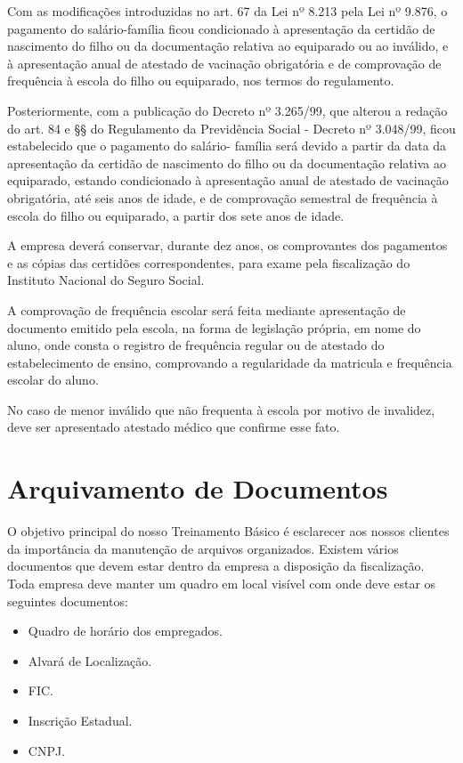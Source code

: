 \documentclass{article}
\begin{document}
Com as modificações introduzidas no art. 67 da Lei nº 8.213 pela Lei nº 9.876, o pagamento do salário-família ficou condicionado à apresentação da certidão de nascimento do filho ou da documentação relativa ao equiparado ou ao inválido, e à apresentação anual de atestado de vacinação obrigatória e de comprovação de frequência à escola do filho ou equiparado, nos termos do regulamento. 

Posteriormente, com a publicação do Decreto nº 3.265/99, que alterou a redação do art. 84 e §§ do Regulamento da Previdência Social - Decreto nº 3.048/99, ficou estabelecido que o pagamento do salário- família será devido a partir da data da apresentação da certidão de nascimento do filho ou da documentação relativa ao equiparado, estando condicionado à apresentação anual de atestado de vacinação obrigatória, até seis anos de idade, e de comprovação semestral de frequência à escola do filho ou equiparado, a partir dos sete anos de idade. 

A empresa deverá conservar, durante dez anos, os comprovantes dos pagamentos e as cópias das certidões correspondentes, para exame pela fiscalização do Instituto Nacional do Seguro Social. 

A comprovação de frequência escolar será feita mediante apresentação de documento emitido pela escola, na forma de legislação própria, em nome do aluno, onde consta o registro de frequência regular ou de atestado do estabelecimento de ensino, comprovando a regularidade da matricula e frequência escolar do aluno. 

No caso de menor inválido que não frequenta à escola por motivo de invalidez, deve ser apresentado atestado médico que confirme esse fato.

\section{Arquivamento de Documentos}
\label{sec:arquivo}
O objetivo principal do nosso Treinamento Básico é esclarecer aos nossos clientes da importância da manutenção de arquivos organizados. Existem vários documentos que devem estar dentro da empresa a disposição da fiscalização. Toda empresa deve manter um quadro em local visível com onde deve estar os seguintes documentos:

\begin{itemize}
  \item Quadro de horário dos empregados.
  \item Alvará de Localização.
  \item FIC.
  \item Inscrição Estadual.
  \item CNPJ.
\end{itemize}
\end{document}
